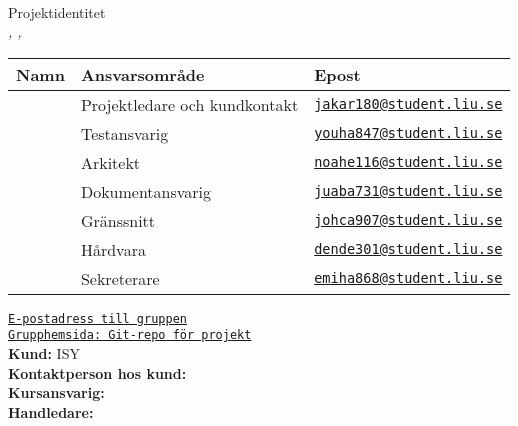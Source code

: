 \documentclass[kravspec/krav.tex]{subfiles}
\newenvironment{projektidentitet}{%
{\ }\vspace{30mm}
\renewcommand{\arraystretch}{2}
\begin{center}
  {\huge Projektidentitet\\[1ex]}
  \textsl{\VARgruppnummer, \LIPSdatum, \VARprojekttitel}\\[1cm]
    \begin{tabular}{lp{60mm}l}
      \hline
      \textbf{Namn} &
      \textbf{Ansvarsområde} &
      \textbf{Epost} \\
	\hline
      }%
      {%
      \hline
    \end{tabular}
\end{center}
}
\newcommand{\gruppmedlem}[3]{{#1} & {#2} & {#3} \\}
\begin{document}
\thispagestyle{empty}

\begin{projektidentitet}
\gruppmedlem{\VARprojektledare}{Projektledare och kundkontakt}{\href{mailto:jakar180@student.liu.se}{\texttt{jakar180@student.liu.se}}}
\gruppmedlem{\VARkundansvarig}{Testansvarig}{\href{mailto:youha847@student.liu.se}{\texttt{youha847@student.liu.se}}}
\gruppmedlem{\VARarkitekt}{Arkitekt}{\href{mailto:noahe116@student.liu.se}{\texttt{noahe116@student.liu.se}}}
\gruppmedlem{\VARdokumentansvarig}{Dokumentansvarig}{\href{mailto:juaba731@student.liu.se}{\texttt{juaba731@student.liu.se}}}

\gruppmedlem{\VARgranssnitt}{Gränssnitt}{\href{mailto:johca907@student.liu.se}{\texttt{johca907@student.liu.se}}}
\gruppmedlem{\VARhardware}{Hårdvara}{\href{mailto:dende301@student.liu.se}{\texttt{dende301@student.liu.se}}}
\gruppmedlem{\VARsekreterare}{Sekreterare}{\href{mailto:emiha868@student.liu.se}{\texttt{emiha868@student.liu.se}}}
\end{projektidentitet}

\begin{center}
\vspace{0.5cm}
{\href{mailto:jakar180@student.liu.se,youha847@student.liu.se,noahe116@student.liu,juaba731@student.liu.se,
    johca907@student.liu.se,dende301@student.liu.se,emiha868@student.liu.se}{
\texttt{E-postadress till gruppen}}}\\

{\href{\VARgrupphemsida}{
\texttt{Grupphemsida: Git-repo för projekt}}}\\[1cm]

{\textbf{Kund:} ISY}\\[0.5ex]
{\textbf{Kontaktperson hos kund:} \VARbestallare}\\[1cm]

{\textbf{Kursansvarig:} \VARkursansvarig}\\[1ex]
{\textbf{Handledare:} \VARhandledare}

\end{center}
\newpage
\end{document}
